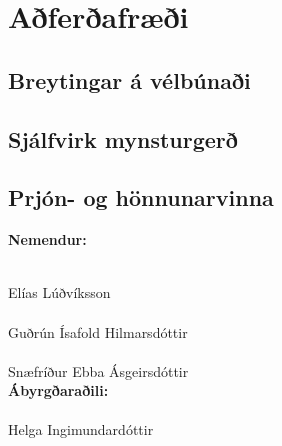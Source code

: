 \documentclass[a4paper,12pt,twoside]{article}
\begin{document}
\section{Aðferðafræði}\label{sec:adferdafraedi}
\subsection{Breytingar á vélbúnaði}

\subsection{Sjálfvirk mynsturgerð}

\subsection{Prjón- og hönnunarvinna}


\newpage
\printbibliography
\fancyfoot{} %

\begin{center}
\textbf{Nemendur:}
\vspace{2cm}

\underline{\hspace{7cm}} \\
Elías Lúðvíksson \\[1.1cm]

\underline{\hspace{7cm}} \\
Guðrún Ísafold Hilmarsdóttir \\[1.1cm]

\underline{\hspace{7cm}} \\
Snæfríður Ebba Ásgeirsdóttir \\[1.1cm]

\textbf{Ábyrgðaraðili:} \\[1.1cm]
\underline{\hspace{7cm}} \\
Helga Ingimundardóttir

\end{center}
\end{document}
